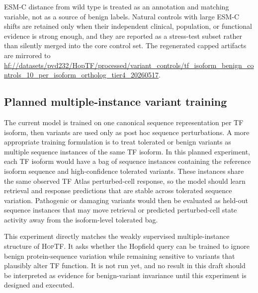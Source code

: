\documentclass[11pt]{article}
\newcommand{\hoptf}{\textsc{HopTF}}
\begin{document}
ESM-C distance from wild type is treated as an annotation and matching variable, not as a source of benign labels. Natural controls with large ESM-C shifts are retained only when their independent clinical, population, or functional evidence is strong enough, and they are reported as a stress-test subset rather than silently merged into the core control set. The regenerated capped artifacts are mirrored to \url{hf://datasets/pvd232/HopTF/processed/variant_controls/tf_isoform_benign_controls_10_per_isoform_ortholog_tier4_20260517}.

\subsection{Planned multiple-instance variant training}

The current model is trained on one canonical sequence representation per TF isoform, then variants are used only as post hoc sequence perturbations. A more appropriate training formulation is to treat tolerated or benign variants as multiple sequence instances of the same TF isoform. In this planned experiment, each TF isoform would have a bag of sequence instances containing the reference isoform sequence and high-confidence tolerated variants. These instances share the same observed TF Atlas perturbed-cell response, so the model should learn retrieval and response predictions that are stable across tolerated sequence variation. Pathogenic or damaging variants would then be evaluated as held-out sequence instances that may move retrieval or predicted perturbed-cell state activity away from the isoform-level tolerated bag.

This experiment directly matches the weakly supervised multiple-instance structure of \hoptf. It asks whether the Hopfield query can be trained to ignore benign protein-sequence variation while remaining sensitive to variants that plausibly alter TF function. It is not run yet, and no result in this draft should be interpreted as evidence for benign-variant invariance until this experiment is designed and executed.
\end{document}
